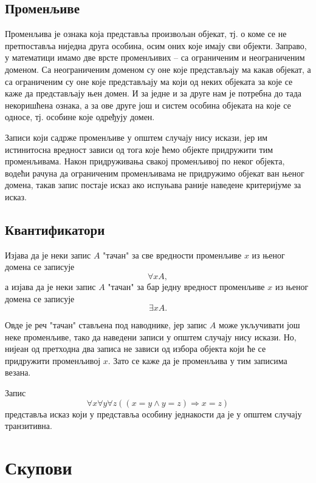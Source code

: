 \documentclass[a4paper]{book}
\newcommand{\tj}{\mbox{тј.} }
\begin{document}
\subsection{Променљиве}

\indent

Променљива је ознака која представља произвољан објекат, \tj о коме се не пре\-тпо\-ста\-вља ниједна друга особина,
осим оних које имају сви објекти. Заправо, у математици имамо две врсте променљивих -- са ограниченим и неограниченим
доменом.
Са неограниченим доменом су оне које представљају ма какав објекат, а са ограниченим су оне које пред\-ста\-вља\-ју ма који од
неких објеката за које се каже да представљају њен домен.
И за једне и за друге нам је потребна до тада некоришћена ознака, а за ове друге још и систем особина објеката на које
се односе, \tj особине које одређују домен.

Записи који садрже променљиве у општем случају нису искази, јер им истинитосна вредност зависи од тога које ћемо
објекте придружити тим променљивама. Након при\-дру\-жи\-ва\-ња свакој променљивој по неког објекта, водећи рачуна да
ограниченим променљивама не придружимо објекат ван њеног домена, такав запис постаје исказ ако испуњава раније
наведене критеријуме за исказ.

\subsection{Квантификатори}

\indent

Изјава да је неки запис $A$ "тачан" за све вредности променљиве $x$ из њеног домена се записује
$$
\forall xA,
$$
а изјава да је неки запис $A$ "тачан" за бар једну вредност променљиве $x$ из њеног домена се записује
$$
\exists xA.
$$

Овде је реч "тачан" стављена под наводнике, јер запис $A$ може укључивати још неке променљиве, тако да наведени
записи у општем случају нису искази. Но, нијеан од прет\-хо\-дна два записа не зависи од избора објекта који ће се
придружити променљивој $x$. Зато се каже да је променљива у тим записима везана.

Запис
$$
\forall x\forall y\forall z((x=y\land y=z)\Rightarrow x=z)
$$
представља исказ који у представља особину једнакости да је у општем случају транзитивна.
\section{Скупови}
\end{document}

